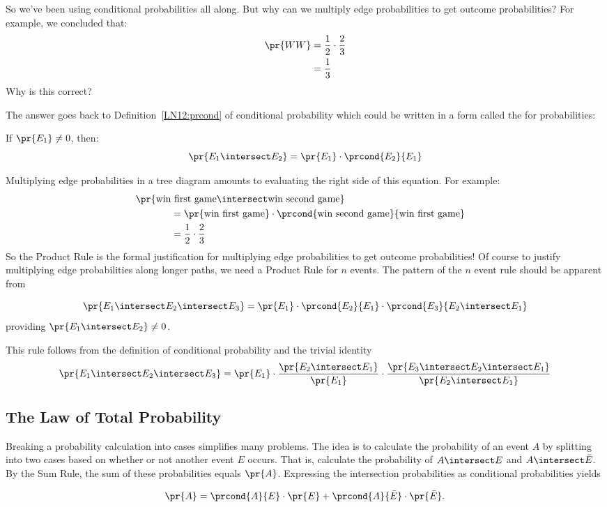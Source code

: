 So we've been using conditional probabilities all along.  But why can
we multiply edge probabilities to get outcome probabilities?  For
example, we concluded that:
%
\begin{align*}
\pr{WW} & = \frac{1}{2} \cdot \frac{2}{3} \\
	& = \frac{1}{3}
\end{align*}
%
Why is this correct?

The answer goes back to Definition~\ref{LN12:prcond} of conditional probability
which could be written in a form called the  for
probabilities:
%
\begin{rul*}
If $\pr{E_1} \neq 0$, then:
%
\[
\pr{E_1 \intersect E_2} = \pr{E_1} \cdot \prcond{E_2}{E_1}
\]
\end{rul*}
%
Multiplying edge probabilities in a tree diagram amounts to evaluating
the right side of this equation.  For example:
%
\begin{align*}
\lefteqn{\pr{\text{win first game} \intersect \text{win second game}}}
		\hspace{0.5in} \\
	& = \pr{\text{win first game}} \cdot
            \prcond{\text{win second game}}{\text{win first game}} \\
	& = \frac{1}{2} \cdot \frac{2}{3}
\end{align*}
%
So the Product Rule is the formal justification for multiplying edge
probabilities to get outcome probabilities!  Of course to justify
multiplying edge probabilities along longer paths, we need a Product Rule
for $n$ events.  The pattern of the $n$ event rule should be apparent from
\begin{rul*}
\[
\pr{E_1 \intersect E_2 \intersect E_3}
   = \pr{E_1} \cdot \prcond{E_2}{E_1} \cdot \prcond{E_3}{E_2 \intersect E_1}
\]
providing $\pr{E_1 \intersect E_2} \neq 0$.
\end{rul*}
This rule follows from the definition of conditional probability and the
trivial identity
\[
\pr{E_1 \intersect E_2 \intersect E_3} =
\pr{E_1}\cdot \frac{\pr{E_2 \intersect E_1}}{\pr{E_1}} \cdot
      \frac{\pr{E_3 \intersect E_2 \intersect E_1}}{\pr{E_2 \intersect E_1}}
\]


\subsection{The Law of Total Probability}

Breaking a probability calculation into cases simplifies many problems.
The idea is to calculate the probability of an event $A$ by splitting into
two cases based on whether or not another event $E$ occurs.  That is,
calculate the probability of $A \intersect E$ and $A \intersect \bar{E}$.
By the Sum Rule, the sum of these probabilities equals $\pr{A}$.
Expressing the intersection probabilities as conditional probabilities yields
\begin{rul*}
\[
\pr{A} = \prcond{A}{E} \cdot \pr{E} +
         \prcond{A}{\bar{E}} \cdot \pr{\bar{E}}.
\]
\end{rul*}


